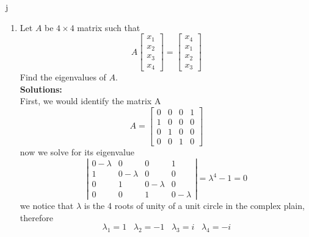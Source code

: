 j\documentclass[12pt]{article}
\newtheorem*{remark}{Remark}
\begin{document}
\begin{enumerate}
\begin{enumerate}
    
    \item \colorbox{yellow}{$\ast$}  Show that $\lambda_{1} \lambda_{2} = |A|$.
    \begin{proof} $\lambda_{1} \lambda_{2} = |A|$
    
    \[
    \lambda_1\lambda_2 = \frac{ \left[ (a+d)+\sqrt{(a+d)^2-4(ad-bc)} \right] \left[ (a+d)-\sqrt{(a+d)^2-4(ad-bc)} \right] }{4}
    \]
    \[
    \lambda_1\lambda_2 = \frac{(a+d)^2-[(a+d)^2-4(ad-bc)]}{4}
    \]
    \[
    \lambda_1\lambda_2 = \frac{4|A|}{4} = |A|
    \]
    \end{proof}

    
\end{enumerate}

\begin{remark} 
The sum of the diagonal terms of a matrix is called the trace of the matrix and is denoted by $tr(A)$.  In the general setting, the sum of the eigenvalues is equal to the trace of the matrix, while the product of eigenvalues is equal to the determinant. 
\end{remark}

\item Let $A$ be $4 \times 4$ matrix such that 
\[
A \begin{bmatrix} x_{1} \\ x_{2} \\ x_{3} \\ x_{4} \end{bmatrix} = \begin{bmatrix} x_{4} \\ x_{1} \\ x_{2} \\ x_{3} \end{bmatrix} 
\]
Find the eigenvalues of $A$.  \\
\textbf{Solutions:}\\
First, we would identify the matrix A
\[
A = 
\begin{bmatrix}
    0&0&0&1\\
    1&0&0&0\\
    0&1&0&0\\
    0&0&1&0
\end{bmatrix}
\]
now we solve for its eigenvalue
\[
\left|\begin{matrix}
0-\lambda & 0 & 0 & 1 \\
1 & 0-\lambda & 0 & 0 \\
0 & 1 & 0-\lambda & 0 \\
0 & 0 & 1 & 0-\lambda
\end{matrix}\right|
=
\lambda^4-1=0
\]
we notice that $\lambda$ is the 4 roots of unity of a unit circle in the complex plain, therefore
\[
\lambda_1 = 1 \;\;\; \lambda_2 = -1 \;\;\; \lambda_3 = i \;\;\; \lambda_4 = -i
\]
\\ 


\end{enumerate}
\end{document}
